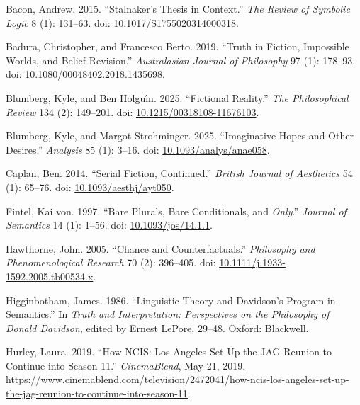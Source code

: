 \documentclass[
  11pt,
  letterpaper,
  DIV=11,
  numbers=noendperiod,
  twoside]{scrartcl}
\newlength{\cslhangindent}
\newenvironment{CSLReferences}[2] %
 {\begin{list}{}{%
  \setlength{\itemindent}{0pt}
  \setlength{\leftmargin}{0pt}
  \setlength{\parsep}{0pt}
  \ifodd #1
   \setlength{\leftmargin}{\cslhangindent}
   \setlength{\itemindent}{-1\cslhangindent}
  \fi
  \setlength{\itemsep}{#2\baselineskip}}}
 {\end{list}}
\begin{document}
\protect{}\label{refs}
\begin{CSLReferences}{1}{0}
Bacon, Andrew. 2015. {``Stalnaker's Thesis in Context.''} \emph{The
Review of Symbolic Logic} 8 (1): 131--63. doi:
\href{https://doi.org/10.1017/S1755020314000318}{10.1017/S1755020314000318}.

Badura, Christopher, and Francesco Berto. 2019. {``Truth in Fiction,
Impossible Worlds, and Belief Revision.''} \emph{Australasian Journal of
Philosophy} 97 (1): 178--93. doi:
\href{https://doi.org/10.1080/00048402.2018.1435698}{10.1080/00048402.2018.1435698}.

Blumberg, Kyle, and Ben Holguı́n. 2025. {``Fictional Reality.''}
\emph{The Philosophical Review} 134 (2): 149--201. doi:
\href{https://doi.org/10.1215/00318108-11676103}{10.1215/00318108-11676103}.

Blumberg, Kyle, and Margot Strohminger. 2025. {``Imaginative Hopes and
Other Desires.''} \emph{Analysis} 85 (1): 3--16. doi:
\href{https://doi.org/10.1093/analys/anae058}{10.1093/analys/anae058}.

Caplan, Ben. 2014. {``Serial Fiction, Continued.''} \emph{British
Journal of Aesthetics} 54 (1): 65--76. doi:
\href{https://doi.org/10.1093/aesthj/ayt050}{10.1093/aesthj/ayt050}.

Fintel, Kai von. 1997. {``Bare Plurals, Bare Conditionals, and
\emph{Only}.''} \emph{Journal of Semantics} 14 (1): 1--56. doi:
\href{https://doi.org/10.1093/jos/14.1.1}{10.1093/jos/14.1.1}.

Hawthorne, John. 2005. {``Chance and Counterfactuals.''}
\emph{Philosophy and Phenomenological Research} 70 (2): 396--405. doi:
\href{https://doi.org/10.1111/j.1933-1592.2005.tb00534.x}{10.1111/j.1933-1592.2005.tb00534.x}.

Higginbotham, James. 1986. {``Linguistic Theory and {Davidson}'s Program
in Semantics.''} In \emph{Truth and Interpretation: Perspectives on the
Philosophy of {Donald Davidson}}, edited by Ernest LePore, 29--48.
Oxford: Blackwell.

Hurley, Laura. 2019. {``How {NCIS: Los Angeles} Set {Up} the {JAG}
Reunion to Continue into Season 11.''} \emph{CinemaBlend}, May 21, 2019.
\url{https://www.cinemablend.com/television/2472041/how-ncis-los-angeles-set-up-the-jag-reunion-to-continue-into-season-11}.


\end{CSLReferences}
\end{document}

